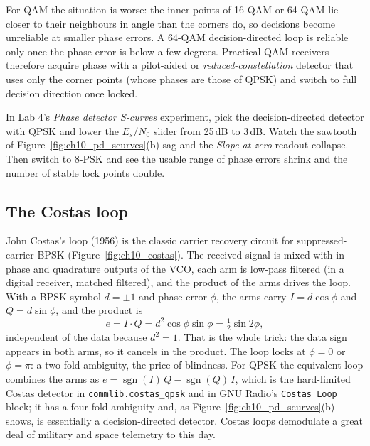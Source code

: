 
For QAM the situation is worse: the inner points of 16-QAM or 64-QAM lie closer to their neighbours
in angle than the corners do, so decisions become unreliable at smaller phase errors. A 64-QAM
decision-directed loop is reliable only once the phase error is below a few degrees. Practical QAM
receivers therefore acquire phase with a pilot-aided or \emph{reduced-constellation} detector that
uses only the corner points (whose phases are those of QPSK) and switch to full decision direction
once locked.

\begin{tryit}
In Lab 4's \emph{Phase detector S-curves} experiment, pick the decision-directed detector with
QPSK and lower the $E_s/N_0$ slider from 25\,dB to 3\,dB. Watch the sawtooth of
Figure~\ref{fig:ch10_pd_scurves}(b) sag and the \emph{Slope at zero} readout collapse. Then switch
to 8-PSK and see the usable range of phase errors shrink and the number of stable lock points
double.
\end{tryit}

\subsection{The Costas loop}

John Costas's loop (1956) is the classic carrier recovery circuit for suppressed-carrier BPSK
(Figure~\ref{fig:ch10_costas}). The received signal is mixed with in-phase and quadrature outputs of
the VCO, each arm is low-pass filtered (in a digital receiver, matched filtered), and the product
of the arms drives the loop. With a BPSK symbol $d=\pm1$ and phase error $\phi$, the arms carry
$I=d\cos\phi$ and $Q=d\sin\phi$, and the product is
\begin{equation}
e=I\cdot Q=d^2\cos\phi\sin\phi=\tfrac12\sin2\phi,
\end{equation}
independent of the data because $d^2=1$. That is the whole trick: the data sign appears in both
arms, so it cancels in the product. The loop locks at $\phi=0$ or $\phi=\pi$: a two-fold
ambiguity, the price of blindness. For QPSK the equivalent loop combines the arms as
$e=\operatorname{sgn}(I)\,Q-\operatorname{sgn}(Q)\,I$, which is the hard-limited Costas detector in
\texttt{commlib.costas\_qpsk} and in GNU Radio's \texttt{Costas Loop} block; it has a four-fold
ambiguity and, as Figure~\ref{fig:ch10_pd_scurves}(b) shows, is essentially a decision-directed
detector. Costas loops demodulate a great deal of military and space telemetry to this day.

